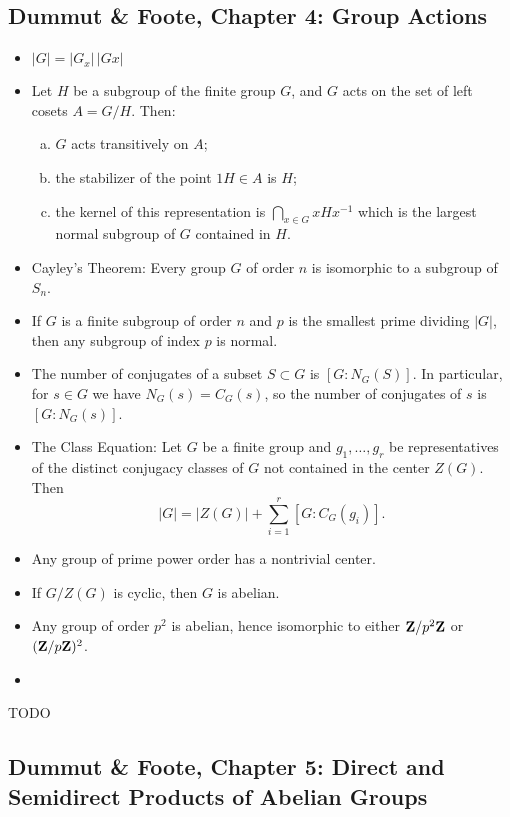 \subsection{Dummut \& Foote, Chapter 4: Group Actions}

\begin{itemize}
\item $|G| = |G_x| \, |G x|$
\item Let $H$ be a subgroup of the finite group $G$, and $G$ acts on the set of left cosets $A = G/H$. Then:
  \begin{enumerate}[(a)]
  \item $G$ acts transitively on $A$;
  \item the stabilizer of the point $1 H \in A$ is $H$;
    \item the kernel of this representation is $\bigcap_{x \in G} x H x^{-1}$ which is the largest normal subgroup of $G$ contained in $H$.
  \end{enumerate}
\item Cayley's Theorem: Every group $G$ of order $n$ is isomorphic to a subgroup of $S_n$.
\item If $G$ is a finite subgroup of order $n$ and $p$ is the smallest prime dividing $|G|$, then any subgroup of index $p$ is normal.
\item The number of conjugates of a subset $S \subset G$ is $[G:N_G(S)]$. In particular, for $s \in G$ we have $N_G(s) = C_G(s)$, so the number of conjugates of $s$ is $[G:N_G(s)]$.
\item The Class Equation: Let $G$ be a finite group and $g_1, \dots, g_r$ be representatives of the distinct conjugacy classes of $G$ not contained in the center $Z(G)$. Then
  \[
  |G| = |Z(G)| + \sum_{i=1}^r [G:C_G(g_i)].
  \]
\item Any group of prime power order has a nontrivial center.
\item If $G/Z(G)$ is cyclic, then $G$ is abelian.
\item Any group of order $p^2$ is abelian, hence isomorphic to either $\mathbf{Z}/p^2\mathbf{Z}$ or $(\mathbf{Z}/p\mathbf{Z})^2$.
\item 
\end{itemize}

TODO

\subsection{Dummut \& Foote, Chapter 5: Direct and Semidirect Products of Abelian Groups}

